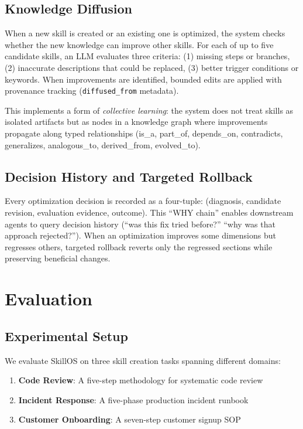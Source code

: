 \documentclass[11pt]{article}
\begin{document}
\subsection{Knowledge Diffusion}

When a new skill is created or an existing one is optimized, the system checks whether the new knowledge can improve other skills. For each of up to five candidate skills, an LLM evaluates three criteria: (1) missing steps or branches, (2) inaccurate descriptions that could be replaced, (3) better trigger conditions or keywords. When improvements are identified, bounded edits are applied with provenance tracking (\texttt{diffused\_from} metadata).

This implements a form of \textit{collective learning}: the system does not treat skills as isolated artifacts but as nodes in a knowledge graph where improvements propagate along typed relationships (is\_a, part\_of, depends\_on, contradicts, generalizes, analogous\_to, derived\_from, evolved\_to).

\subsection{Decision History and Targeted Rollback}

Every optimization decision is recorded as a four-tuple: (diagnosis, candidate revision, evaluation evidence, outcome). This ``WHY chain'' enables downstream agents to query decision history (``was this fix tried before?'' ``why was that approach rejected?''). When an optimization improves some dimensions but regresses others, targeted rollback reverts only the regressed sections while preserving beneficial changes.

\section{Evaluation}
\label{sec:evaluation}

\subsection{Experimental Setup}

We evaluate SkillOS on three skill creation tasks spanning different domains:

\begin{enumerate}[leftmargin=*,nosep]
    \item \textbf{Code Review}: A five-step methodology for systematic code review
    \item \textbf{Incident Response}: A five-phase production incident runbook
    \item \textbf{Customer Onboarding}: A seven-step customer signup SOP
\end{enumerate}
\end{document}
